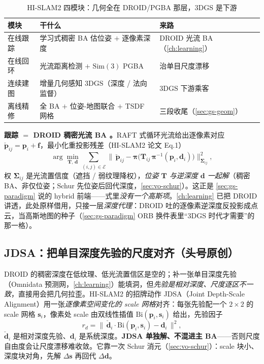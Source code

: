 \begin{table}[H]\centering
\caption{HI-SLAM2 四模块：几何全在 DROID/PGBA 那层，3DGS 是下游}
\label{tab:gs-hislam2}
\small
\begin{tabular}{@{}lll@{}}
\toprule
模块 & 干什么 & 来路 \\
\midrule
在线跟踪 & 学习式稠密 BA 估位姿 $+$ 逐像素深度 & DROID 光流 BA（\cref{ch:learning}）\\
在线回环 & 光流距离检测 $+$ $\mathrm{Sim}(3)$ PGBA & 治单目尺度漂移 \\
连续建图 & 增量几何感知 3DGS（深度 / 法向监督）& 3DGS 下游乘客 \\
离线精修 & 全 BA $+$ 位姿-地图联合 $+$ TSDF 网格 & 三段收尾（\cref{sec:gs-geom}）\\
\bottomrule
\end{tabular}
\end{table}

\textbf{跟踪 $=$ DROID 稠密光流 BA \cite{teed2021droid}。}RAFT 式循环光流给出逐像素对应 $\check{\mathbf p}_{ij}=\mathbf p_i+\mathbf f$，最小化重投影残差（HI-SLAM2 论文 Eq.1）
\begin{equation}
\arg\min_{\mathbf T,\,\mathbf d}\sum_{(i,j)\in\mathcal E}\big\lVert\,\check{\mathbf p}_{ij}-\boldsymbol\pi\big(\mathbf T_{ij}\,\boldsymbol\pi^{-1}(\mathbf p_i,\mathbf d_i)\big)\big\rVert^2_{\boldsymbol\Sigma_{ij}} ,
\label{eq:gs-droidba}
\end{equation}
权 $\boldsymbol\Sigma_{ij}$ 是光流置信度（遮挡 / 弱纹理降权），\emph{位姿 $\mathbf T$ 与逆深度 $\mathbf d$ 一起解}（稠密 BA、非仅位姿；Schur 先位姿后回代深度，\cref{sec:vo-schur}）。这正是 \cref{sec:gs-paradigm} 说的 hybrid 前端——式里\emph{没有一个高斯项}。\cref{ch:learning} 已把 DROID 讲透，此处原样借用，只接一层\emph{深度代理}：DROID 吐的逐像素逆深度反投影成点云，当高斯地图的种子（\cref{sec:gs-paradigm} ORB 换件表里“3DGS 时代才需要”的那一格）。

\subsection{JDSA：把单目深度先验的尺度对齐（头号原创）}

DROID 的稠密深度在低纹理、低光流置信区是空的；补一张单目深度先验（Omnidata 预测网，\cref{ch:learning}）能填洞，但\emph{先验是相对深度、尺度逐区不一致}，直接用会把几何拉歪。HI-SLAM2 的招牌动作 JDSA（Joint Depth-Scale Alignment）用一张\emph{逐像素空间变化的 scale 网格}对齐：每张先验配一个 $2\times2$ 的 scale 网格 $\mathbf s_i$，像素处 scale 由双线性插值 $\mathrm{Bi}(\mathbf p_i,\mathbf s_i)$ 给出，先验因子
\begin{equation}
r_d=\big\lVert\,\check{\mathbf d}_i\cdot\mathrm{Bi}(\mathbf p_i,\mathbf s_i)-\mathbf d_i\,\big\rVert^2 ,
\label{eq:gs-jdsa}
\end{equation}
$\check{\mathbf d}_i$ 是相对深度先验、$\mathbf d_i$ 是系统深度。\textbf{JDSA 单独解、不混进主 BA}——否则尺度自由度会让尺度漂移难收敛。它靠一次 Schur 消元（\cref{sec:vo-schur}）：scale 块小、深度块对角，先解 $\Delta\mathbf s$ 再回代 $\Delta\mathbf d$。

